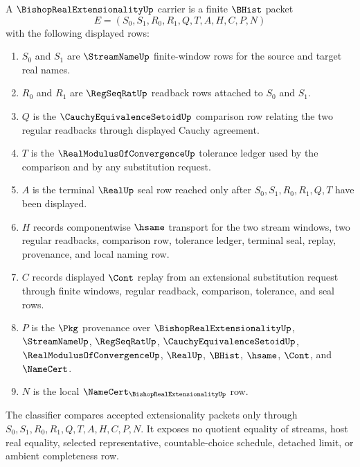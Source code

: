 \begin{definition}
\label{def:bishop-real-extensionality-carrier}
A $\BishopRealExtensionalityUp$ carrier is a finite $\BHist$ packet
$$
E=(S_0,S_1,R_0,R_1,Q,T,A,H,C,P,N)
$$
with the following displayed rows:
\begin{enumerate}
\item $S_0$ and $S_1$ are $\StreamNameUp$ finite-window rows for the source and target real names.
\item $R_0$ and $R_1$ are $\RegSeqRatUp$ readback rows attached to $S_0$ and $S_1$.
\item $Q$ is the $\CauchyEquivalenceSetoidUp$ comparison row relating the two regular readbacks through displayed Cauchy agreement.
\item $T$ is the $\RealModulusOfConvergenceUp$ tolerance ledger used by the comparison and by any substitution request.
\item $A$ is the terminal $\RealUp$ seal row reached only after $S_0,S_1,R_0,R_1,Q,T$ have been displayed.
\item $H$ records componentwise $\hsame$ transport for the two stream windows, two regular readbacks, comparison row, tolerance ledger, terminal seal, replay, provenance, and local naming row.
\item $C$ records displayed $\Cont$ replay from an extensional substitution request through finite windows, regular readback, comparison, tolerance, and seal rows.
\item $P$ is the $\Pkg$ provenance over $\BishopRealExtensionalityUp$, $\StreamNameUp$, $\RegSeqRatUp$, $\CauchyEquivalenceSetoidUp$, $\RealModulusOfConvergenceUp$, $\RealUp$, $\BHist$, $\hsame$, $\Cont$, and $\NameCert$.
\item $N$ is the local $\NameCert_{\BishopRealExtensionalityUp}$ row.
\end{enumerate}
The classifier compares accepted extensionality packets only through $S_0,S_1,R_0,R_1,Q,T,A,H,C,P,N$. It exposes no quotient equality of streams, host real equality, selected representative, countable-choice schedule, detached limit, or ambient completeness row.
\end{definition}

